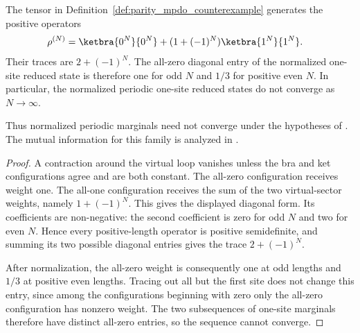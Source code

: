 \begin{lemma}
    \label{thm:parity_mpdo_no_thermodynamic_limit}
    \leanok
    The tensor in Definition~\ref{def:parity_mpdo_counterexample} generates the
    positive operators
    \begin{align}
        \rho^{(N)}
         & =\ketbra{0^N}{0^N}
        +(1+(-1)^N)\ketbra{1^N}{1^N}.
        \notag
    \end{align}
    Their traces are $2+(-1)^N$. The all-zero diagonal entry of the normalized
    one-site reduced state is therefore one for odd $N$ and $1/3$ for positive
    even $N$. In particular, the normalized periodic one-site reduced states
    do not converge as $N\to\infty$.

    Thus normalized periodic marginals need not converge under the hypotheses
    of \cite[Proposition~4.5, lines~801--806]{Cirac2016MPDO_arXiv}. The mutual
    information for this family is analyzed in
    \cite{gap:cpgsv17_mpdo_mutual_information_bound}.
\end{lemma}

\begin{proof}\leanok
    A contraction around the virtual loop vanishes unless the bra and ket
    configurations agree and are both constant. The all-zero configuration
    receives weight one. The all-one configuration receives the sum of the
    two virtual-sector weights, namely $1+(-1)^N$. This gives the displayed
    diagonal form. Its coefficients are non-negative: the second coefficient
    is zero for odd $N$ and two for even $N$. Hence every positive-length
    operator is positive semidefinite, and summing its two possible diagonal
    entries gives the trace $2+(-1)^N$.

    After normalization, the all-zero weight is consequently one at odd
    lengths and $1/3$ at positive even lengths. Tracing out all but the first
    site does not change this entry, since among the configurations beginning
    with zero only the all-zero configuration has nonzero weight. The two
    subsequences of one-site marginals therefore have distinct all-zero
    entries, so the sequence cannot converge.
\end{proof}

